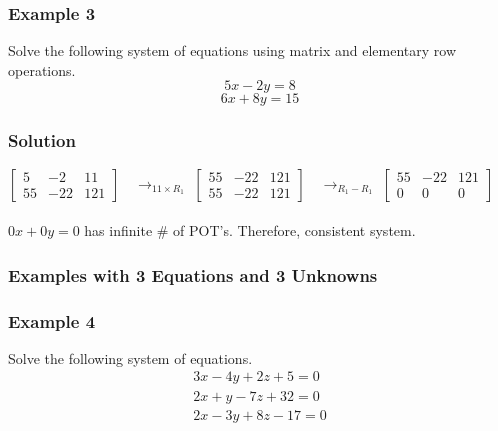 \documentclass{article}
\begin{document}
\subsubsection*{Example 3}
Solve the following system of equations using matrix and elementary row operations.
$$5x-2y=8$$
$$6x+8y=15$$
\subsubsection*{Solution}
$ \left[\begin{array}{ll|l}
5 & -2 & 11 \\
55 & -22 & 121
\end{array}\right] \quad \rightarrow_{11 \times R_1}$
$ \left[\begin{array}{ll|l}
55 & -22 & 121 \\
55 & -22 & 121
\end{array}\right] \quad \rightarrow_{R_1 - R_1}$
$ \left[\begin{array}{ll|l}
55 & -22 & 121 \\
0 & 0 & 0
\end{array}\right] $\\\\
$0x+0y=0$ has infinite \# of POT's. Therefore, consistent system.
\subsubsection{Examples with 3 Equations and 3 Unknowns}
\subsubsection*{Example 4}
Solve the following system of equations.
\begin{align*}
    3x-4y+2z+5=0\\
    2x+y-7z+32=0\\
    2x-3y+8z-17=0
\end{align*}
\end{document}
